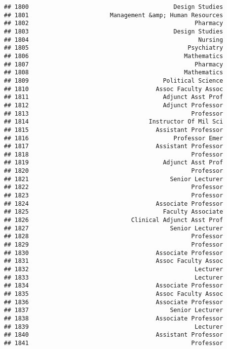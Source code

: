 \documentclass[
]{article}
\begin{document}
\begin{verbatim}
## 1800                                         Design Studies
## 1801                       Management &amp; Human Resources
## 1802                                               Pharmacy
## 1803                                         Design Studies
## 1804                                                Nursing
## 1805                                             Psychiatry
## 1806                                            Mathematics
## 1807                                               Pharmacy
## 1808                                            Mathematics
## 1809                                      Political Science
## 1810                                    Assoc Faculty Assoc
## 1811                                      Adjunct Asst Prof
## 1812                                      Adjunct Professor
## 1813                                              Professor
## 1814                                  Instructor Of Mil Sci
## 1815                                    Assistant Professor
## 1816                                         Professor Emer
## 1817                                    Assistant Professor
## 1818                                              Professor
## 1819                                      Adjunct Asst Prof
## 1820                                              Professor
## 1821                                        Senior Lecturer
## 1822                                              Professor
## 1823                                              Professor
## 1824                                    Associate Professor
## 1825                                      Faculty Associate
## 1826                             Clinical Adjunct Asst Prof
## 1827                                        Senior Lecturer
## 1828                                              Professor
## 1829                                              Professor
## 1830                                    Associate Professor
## 1831                                    Assoc Faculty Assoc
## 1832                                               Lecturer
## 1833                                               Lecturer
## 1834                                    Associate Professor
## 1835                                    Assoc Faculty Assoc
## 1836                                    Associate Professor
## 1837                                        Senior Lecturer
## 1838                                    Associate Professor
## 1839                                               Lecturer
## 1840                                    Assistant Professor
## 1841                                              Professor

\end{verbatim}
\end{document}
